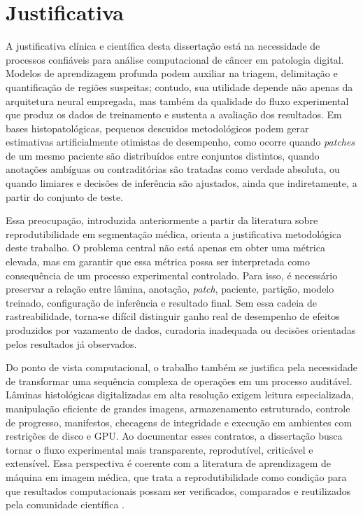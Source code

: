 \section{Justificativa}\label{sec:justificativa}

A justificativa clínica e científica desta dissertação está na necessidade de
processos confiáveis para análise computacional de câncer em patologia digital.
Modelos de aprendizagem profunda podem auxiliar na triagem, delimitação e
quantificação de regiões suspeitas; contudo, sua utilidade depende não apenas da
arquitetura neural empregada, mas também da qualidade do fluxo experimental que
produz os dados de treinamento e sustenta a avaliação dos resultados. Em bases
histopatológicas, pequenos descuidos metodológicos podem gerar estimativas
artificialmente otimistas de desempenho, como ocorre quando \textit{patches} de
um mesmo paciente são distribuídos entre conjuntos distintos, quando anotações
ambíguas ou contraditórias são tratadas como verdade absoluta, ou quando
limiares e decisões de inferência são ajustados, ainda que indiretamente, a
partir do conjunto de teste.

Essa preocupação, introduzida anteriormente a partir da literatura sobre
reprodutibilidade em segmentação médica, orienta a justificativa metodológica
deste trabalho. O problema central não está apenas em obter uma métrica elevada,
mas em garantir que essa métrica possa ser interpretada como consequência de um
processo experimental controlado. Para isso, é necessário preservar a relação
entre lâmina, anotação, \textit{patch}, paciente, partição, modelo treinado,
configuração de inferência e resultado final. Sem essa cadeia de rastreabilidade,
torna-se difícil distinguir ganho real de desempenho de efeitos produzidos por
vazamento de dados, curadoria inadequada ou decisões orientadas pelos resultados
já observados.

Do ponto de vista computacional, o trabalho também se justifica pela necessidade
de transformar uma sequência complexa de operações em um processo auditável.
Lâminas histológicas digitalizadas em alta resolução exigem leitura
especializada, manipulação eficiente de grandes imagens, armazenamento
estruturado, controle de progresso, manifestos, checagens de integridade e
execução em ambientes com restrições de disco e GPU. Ao documentar esses
contratos, a dissertação busca tornar o fluxo experimental mais transparente,
reprodutível, criticável e extensível. Essa perspectiva é coerente com a
literatura de aprendizagem de máquina em imagem médica, que trata a
reprodutibilidade como condição para que resultados computacionais possam ser
verificados, comparados e reutilizados pela comunidade científica
\cite{colliot2023reproducibility}.

